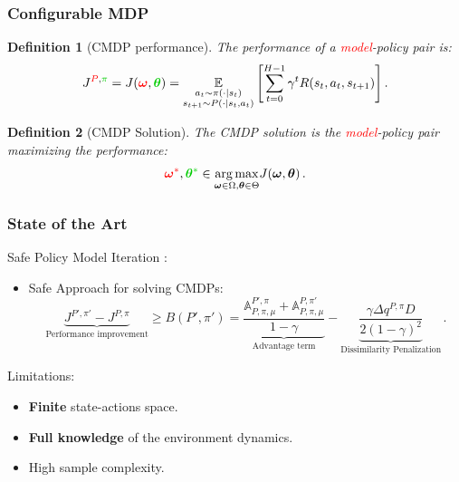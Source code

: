 \documentclass[english,aspectratio=1610]{beamer}
\theoremstyle{mystyle}
\newtheorem{defi}{Definition}
\theoremstyle{mystyle}
\theoremstyle{mystyle}
\begin{document}
\begin{frame}
\frametitle{Configurable MDP}
\begin{defi}[CMDP performance]
The performance of a \textcolor{red}{model}-\textcolor{green!80!black}{policy} pair is:
\begin{equation}
	J^{\textcolor{red}{P},\textcolor{green!80!black}{\pi}} = J(\textcolor{red}{\bm{\omega}},\textcolor{green!80!black}{\bm{\theta}}) = \underset{\begin{subarray}{c}
	a_t \sim \pi(\cdot | s_t) \\
	s_{t+1} \sim P(\cdot | s_t, a_t)
\end{subarray}}{\mathbb{E}} \left[\sum_{t=0}^{H-1} \gamma^t R(s_t,a_t,s_{t+1}) \right] .
\end{equation}
\end{defi}
	\begin{defi}[CMDP Solution]
 	The CMDP solution is the \textcolor{red}{model}-\textcolor{green!80!black}{policy} pair maximizing the performance:
\begin{equation}
	\textcolor{red}{\bm{\omega}^*}, \textcolor{green!80!black}{\bm{\theta}^*} \in \underset{\bm{\omega} \in \Omega, \bm{\theta} \in \Theta}{\arg \max} J(\bm{\omega},\bm{\theta})  \, .
\end{equation}
 \end{defi}
\end{frame}

\begin{frame}[t]
\frametitle{State of the Art}
Safe Policy Model Iteration \citep{cmdp}:
\begin{itemize}
	\item Safe Approach \citep{pmlr-v28-pirotta13} for solving CMDPs:
	 \begin{equation}
	\underbrace{J^{P', \pi'} - J^{P, \pi}}_{\text{Performance improvement}} \geq B(P',\pi') = \underbrace{\frac{\mathds{A}_{P,\pi,\mu}^{P',\pi}+\mathds{A}_{P,\pi, \mu}^{P,\pi'}}{1-\gamma}}_{\text{Advantage term}}-\underbrace{\frac{\gamma\Delta q^{P,\pi}D}{2 (1 -\gamma)^2}}_{\text{Dissimilarity Penalization}} \, .
	\label{eq:spmi-lower}
\end{equation}
\end{itemize}
Limitations:
\begin{itemize}
	\item \textbf{Finite} state-actions space.
	\item \textbf{Full knowledge} of the environment dynamics.
	\item High sample complexity.
\end{itemize}
\end{frame}
\end{document}
